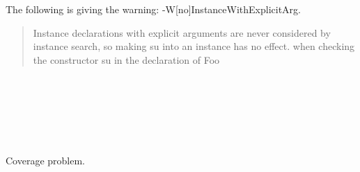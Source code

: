 \documentclass{article}
\begin{document}
The following is giving the warning: -W[no]InstanceWithExplicitArg.

\begin{quotation}
Instance declarations with explicit arguments are never considered
by instance search, so making su into an instance has no effect.
when checking the constructor su in the declaration of Foo
\end{quotation}

\begin{code}%
\>[0]\AgdaSpace{}%
\AgdaSpace{}%
\<%
\\
%
\\[\AgdaEmptyExtraSkip]%
\>[0][@{}l@{\AgdaIndent{0}}]%
\>[2]\AgdaSpace{}%
\AgdaSpace{}%
\AgdaSymbol{:}\AgdaSpace{}%
\AgdaSpace{}%
\AgdaSpace{}%
\AgdaSpace{}%
\<%
\\
\>[2][@{}l@{\AgdaIndent{0}}]%
\>[4]%
\>[44]\<%
\\
\>[4][@{}l@{\AgdaIndent{0}}]%
\>[6]\AgdaSpace{}%
\AgdaSymbol{:}\AgdaSpace{}%
\AgdaSpace{}%
\<%
\\
%
\>[6]\AgdaSpace{}%
\AgdaSymbol{:}\AgdaSpace{}%
\AgdaSymbol{\{}\AgdaSpace{}%
\AgdaSymbol{:}\AgdaSpace{}%
\AgdaSymbol{\}}\AgdaSpace{}%
\AgdaSpace{}%
\AgdaSpace{}%
\AgdaSpace{}%
\AgdaSpace{}%
\AgdaSpace{}%
\AgdaSymbol{(}\AgdaSpace{}%
\AgdaSymbol{)}%
\>[44]\<%
\end{code}

Coverage problem.

\begin{code}%
\>[0]\AgdaSpace{}%
\AgdaSpace{}%
\<%
\\
%
\\[\AgdaEmptyExtraSkip]%
\>[0][@{}l@{\AgdaIndent{0}}]%
\>[2]\AgdaSpace{}%
\AgdaSymbol{:}\AgdaSpace{}%
\AgdaSpace{}%
\AgdaSpace{}%
\AgdaSymbol{\{}\AgdaSpace{}%
\AgdaSymbol{:}\AgdaSpace{}%
\AgdaSymbol{\}}\AgdaSpace{}%
\AgdaSpace{}%
\<%
\\
%
\>[2]\AgdaSpace{}%
\AgdaSymbol{(}\AgdaSpace{}%
\AgdaSymbol{)}\AgdaSpace{}%
\AgdaSymbol{=}\AgdaSpace{}%
\AgdaSpace{}%
\<%
\\
\>[0]\<%
\end{code}
\end{document}
